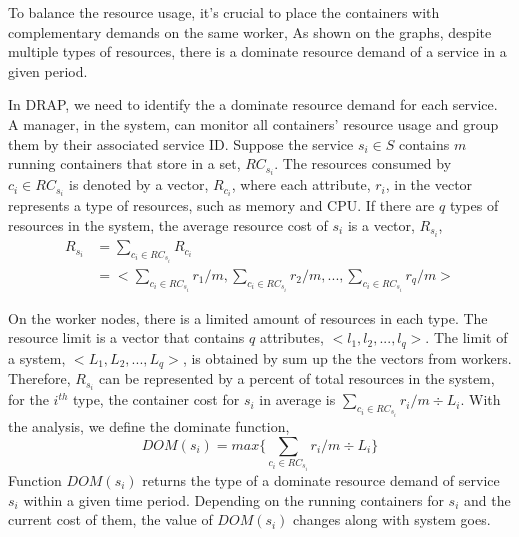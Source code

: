 To balance the resource usage, it's crucial to place the containers with complementary demands on the same worker, 
As shown on the graphs, despite multiple types of resources, 
there is a dominate resource demand of a service in a given period. 

In DRAP, we need to identify the a dominate resource demand for each service. 
A manager, in the system, can monitor all containers' resource usage and group them by their associated service ID. 
Suppose the service $s_i \in S$ contains
$m$ running containers that store in a set, $RC_{s_i}$. The resources consumed by $c_i \in RC_{s_i}$ is denoted by a vector, 
$R_{c_i}$, where each attribute, $r_i$, in the vector represents a type of resources, such as memory and CPU. 
If there are $q$ types of resources in the system, the average resource cost of $s_i$ is a vector, $R_{s_i}$,
\begin{equation*}
\begin{aligned}
 R_{s_i} & = \sum\nolimits_{c_i \in RC_{s_i}} R_{c_i} \\
         & = <\sum_{c_i \in RC_{s_i}} r_1 / m, \sum_{c_i \in RC_{s_i}} r_2 / m, ..., \sum_{c_i \in RC_{s_i}} r_q / m>
 \end{aligned}
\end{equation*}

On the worker nodes, there is a limited amount of resources in each type. 
The resource limit is a vector that contains $q$ attributes, $<l_1, l_2, ..., l_q>$. 
The limit of a system, $<L_1, L_2, ..., L_q>$, is obtained by sum up the the vectors from workers.
Therefore,  $R_{s_i}$ can be represented by a percent of total resources in the system, for the 
$i^{th}$ type, the container cost for $s_i$ in average is $\sum_{c_i \in RC_{s_i}} r_i / m \div L_i$.
With the analysis, we define the dominate function, 
\begin{equation*}
  DOM(s_i) = max \{ \sum_{c_i \in RC_{s_i}} r_i / m \div L_i \}
\end{equation*}
Function $DOM(s_i)$ returns the type of a dominate resource demand of service $s_i$ within a given time period.
Depending on the running containers for $s_i$ and the current cost of them, the value of $DOM(s_i)$ changes along with
system goes.


